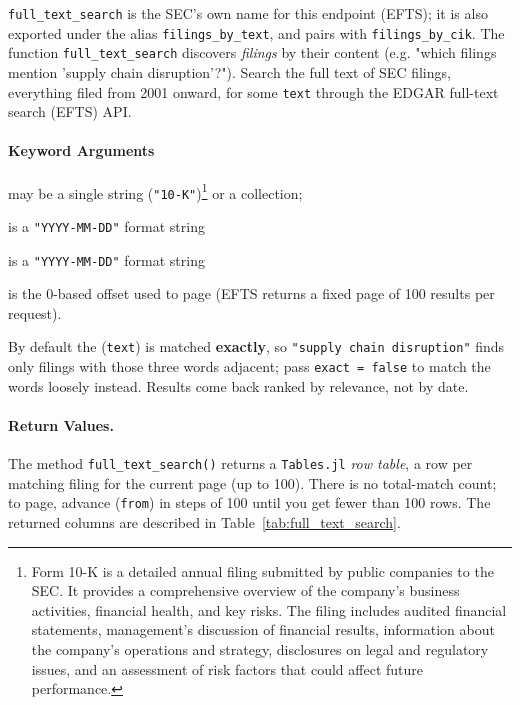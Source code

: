 \documentclass[11pt,a4paper]{report}
\begin{document}
\noindent \texttt{full\_text\_search} is the SEC's own name for this endpoint (EFTS); it is also exported under the alias \texttt{filings\_by\_text}, and pairs with \texttt{filings\_by\_cik}. The function
\texttt{full\_text\_search} discovers \textit{filings} by their content (e.g. "which filings mention 'supply chain disruption'?"). Search the full text of SEC filings, everything filed from 2001 onward, for some \texttt{text} through the EDGAR full-text search (EFTS) API. 

\paragraph{Keyword Arguments}
\begin{description}[nosep]
  \item[\quad - \texttt{exact}]
  \item[\quad - \texttt{forms}] may be a single string (\texttt{"10-K"})\footnote{Form 10-K is a detailed annual filing submitted by public companies to the SEC. It provides a comprehensive overview of the company's business activities, financial health, and key risks. The filing includes audited financial statements, management's discussion of financial results, information about the company's operations and strategy, disclosures on legal and regulatory issues, and an assessment of risk factors that could affect future performance.} or a collection; 
  \item[\quad - \texttt{startdate}] is a \texttt{"YYYY-MM-DD"} format string
  \item[\quad - \texttt{enddate}] is a \texttt{"YYYY-MM-DD"} format string 
  \item[\quad - \texttt{from}] is the 0-based offset used to page (EFTS returns a fixed page of 100 results per request). 
\end{description}
By default the (\texttt{text}) is matched \textbf{exactly}, so
\texttt{"supply chain disruption"} finds only filings with those three words adjacent;
pass \texttt{exact = false} to match the words loosely instead. Results come back
ranked by relevance, not by date.

\paragraph{Return Values.} The method \texttt{full\_text\_search()} returns a \texttt{Tables.jl} \emph{row table}, a row per matching filing for the current page (up to 100). There is no total-match count; to page, advance (\texttt{from}) in steps of 100 until you get fewer than 100 rows. The returned columns are described in Table~\ref{tab:full_text_search}.
\end{document}
